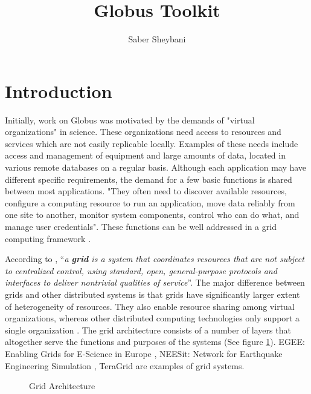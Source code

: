 \documentclass[9pt,twocolumn,twoside]{styles/osajnl}
\title{Globus Toolkit}
\author[1,*]{Saber Sheybani}
\affil[1]{School of Informatics and Computing, Bloomington, IN 47408, U.S.A.}
\affil[*]{Corresponding authors: sheybani@indiana.edu}
\begin{document}
 

\maketitle 

\section{Introduction} 

Initially, work on Globus was motivated by the demands of "virtual organizations" in science. These organizations need access to resources and services which are not easily replicable locally. Examples of these needs include access and management of equipment and large amounts of data, located in various remote databases on a regular basis. Although each application may have different specific requirements, the demand for a few basic functions is shared between most applications. "They often need to discover available resources, configure a computing resource to run an application, move data reliably from one site to another, monitor system components, control who can do what, and manage user credentials". These functions can be well addressed in a grid computing framework \cite{foster2006globus}.

According to \cite{sotomayor2006globus}, ``\emph{a \textbf{grid} is a system that coordinates resources that are not subject to centralized control, using standard, open, general-purpose protocols and interfaces to deliver nontrivial qualities of service}''. The major difference between grids and other distributed systems is that grids have significantly larger extent of heterogeneity of resources. They also enable resource sharing among virtual organizations, whereas other distributed computing technologies only support a single organization \cite{magoules2009introduction}. The grid architecture consists of a number of layers that altogether serve the functions and purposes of the systems (See figure \ref{fig:grid-arch}). EGEE: Enabling Grids for E-Science in Europe \cite{egee-web}, NEESit: Network for Earthquake Engineering Simulation \cite{neesit-web}, TeraGrid \cite{teragrid-wiki} are examples of grid systems.
\begin{figure}[htbp]
\centering
{}
\caption{Grid Architecture \cite{sotomayor2006globus}}
\label{fig:grid-arch}
\end{figure}
\end{document}
